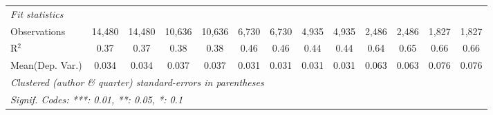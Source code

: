 \begin{tabular}{lcccccccccccc}
   \midrule
   \emph{Fit statistics}\\
   Observations                             & 14,480        & 14,480        & 10,636  & 10,636       & 6,730        & 6,730          & 4,935        & 4,935          & 2,486   & 2,486        & 1,827   & 1,827\\  
   R$^2$                                    & 0.37          & 0.37          & 0.38    & 0.38         & 0.46         & 0.46           & 0.44         & 0.44           & 0.64    & 0.65         & 0.66    & 0.66\\  
Mean(Dep. Var.) & 0.034 & 0.034 & 0.037 & 0.037 & 0.031 & 0.031 & 0.031 & 0.031 & 0.063 & 0.063 & 0.076 & 0.076 \\
   \midrule \midrule
   \multicolumn{13}{l}{\emph{Clustered (author \& quarter) standard-errors in parentheses}}\\
   \multicolumn{13}{l}{\emph{Signif. Codes: ***: 0.01, **: 0.05, *: 0.1}}\\
\end{tabular}
\par\endgroup
